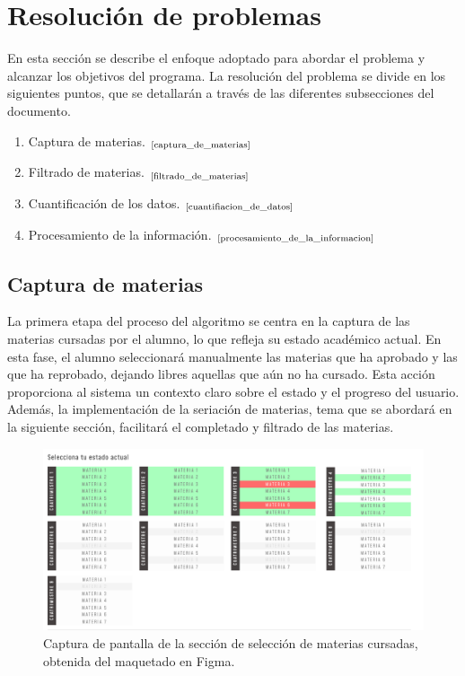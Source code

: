 \section{Resolución de problemas}
En esta sección se describe el enfoque adoptado para abordar el problema y alcanzar los objetivos del programa. La resolución del problema se divide en los siguientes puntos, que se detallarán a través de las diferentes subsecciones del documento.

\begin{enumerate}
    \item Captura de materias. $_{\text{\ref{captura_de_materias}}}$
    \item Filtrado de materias. $_{\text{\ref{filtrado_de_materias}}}$
    \item Cuantificación de los datos. $_{\text{\ref{cuantifiacion_de_datos}}}$
    \item Procesamiento de la información. $_{\text{\ref{procesamiento_de_la_informacion}}}$
\end{enumerate}

\subsection{Captura de materias} \label{captura_de_materias}
La primera etapa del proceso del algoritmo se centra en la captura de las materias cursadas por el alumno, lo que refleja su estado académico actual. En esta fase, el alumno seleccionará manualmente las materias que ha aprobado y las que ha reprobado, dejando libres aquellas que aún no ha cursado. Esta acción proporciona al sistema un contexto claro sobre el estado y el progreso del usuario. Además, la implementación de la seriación de materias, tema que se abordará en la siguiente sección, facilitará el completado y filtrado de las materias. %

\begin{figure}[h]
    \centering
    \includegraphics[width=\textwidth]{images/current_status_figma_screenshot.png}
    \caption{Captura de pantalla de la sección de selección de materias cursadas, obtenida del maquetado en Figma.}
    \label{fig:captura_materias}
\end{figure}


